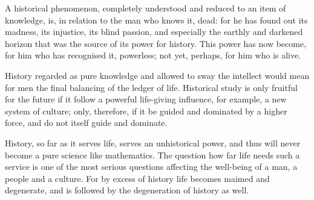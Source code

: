 A historical phenomenon, completely understood and reduced to an item
of knowledge, is, in relation to the man who knows it, dead: for he
has found out its madness, its injustice, its blind passion, and
especially the earthly and darkened horizon that was the source of
its power for history. This power has now become, for him who has
recognised it, powerless; not yet, perhaps, for him who is alive.

History regarded as pure knowledge and allowed to sway the intellect
would mean for men the final balancing of the ledger of life.
Historical study is only fruitful for the future if it follow a
powerful life-giving influence, for example, a new system of culture;
only, therefore, if it be guided and dominated by a higher force, and
do not itself guide and dominate.

History, so far as it serves life, serves an unhistorical power, and
thus will never become a pure science like mathematics. The question
how far life needs such a service is one of the most serious
questions affecting the well-being of a man, a people and a culture.
For by excess of history life becomes maimed and degenerate, and is
followed by the degeneration of history as well.
